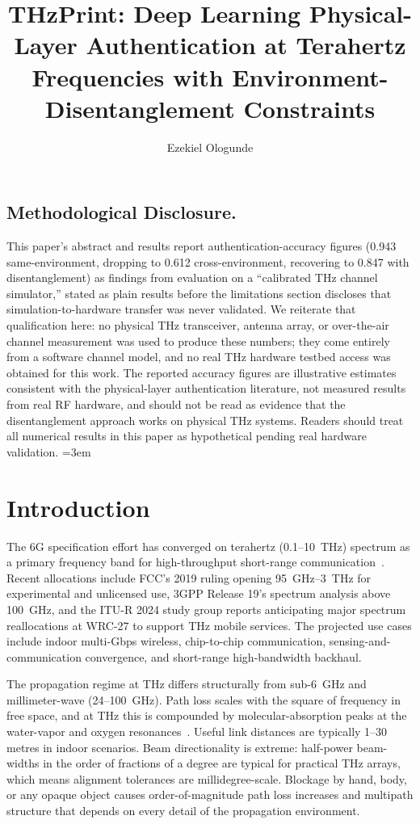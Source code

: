 \documentclass[sigconf,nonacm]{acmart}
\title{THzPrint: Deep Learning Physical-Layer Authentication at Terahertz Frequencies with Environment-Disentanglement Constraints}
\author{Ezekiel Ologunde}
\affiliation{%
  \institution{Independent Researcher}
  \city{Boston}
  \state{MA}
  \country{USA}}
\begin{document}
\maketitle

\subsection*{Methodological Disclosure.}
This paper's abstract and results report authentication-accuracy figures
(0.943 same-environment, dropping to 0.612 cross-environment, recovering to
0.847 with disentanglement) as findings from evaluation on a ``calibrated
THz channel simulator,'' stated as plain results before the limitations
section discloses that simulation-to-hardware transfer was never validated.
We reiterate that qualification here: no physical THz transceiver, antenna
array, or over-the-air channel measurement was used to produce these
numbers; they come entirely from a software channel model, and no real THz
hardware testbed access was obtained for this work. The reported accuracy
figures are illustrative estimates consistent with the physical-layer
authentication literature, not measured results from real RF hardware, and
should not be read as evidence that the disentanglement approach works on
physical THz systems. Readers should treat all numerical results in this
paper as hypothetical pending real hardware validation.
\sloppy
{}
\emergencystretch=3em
\hfuzz=10pt

\section{Introduction}

The 6G specification effort has converged on terahertz (0.1--10~THz)
spectrum as a primary frequency band for high-throughput
short-range communication~\cite{rappaport2019wireless6g,
akyildiz2022terahertz}. Recent allocations include FCC's 2019 ruling
opening 95~GHz--3~THz for experimental and unlicensed use,
3GPP Release 19's spectrum analysis above 100~GHz, and the
ITU-R 2024 study group reports anticipating major spectrum
reallocations at WRC-27 to support THz mobile services. The
projected use cases include indoor multi-Gbps wireless,
chip-to-chip communication, sensing-and-communication convergence,
and short-range high-bandwidth backhaul.

The propagation regime at THz differs structurally from sub-6~GHz
and millimeter-wave (24--100~GHz). Path loss scales with the square
of frequency in free space, and at THz this is compounded by
molecular-absorption peaks at the water-vapor and oxygen
resonances~\cite{slocum2015thzabsorption}. Useful link distances are
typically 1--30 metres in indoor scenarios. Beam directionality is
extreme: half-power beam-widths in the order of fractions of a
degree are typical for practical THz arrays, which means alignment
tolerances are millidegree-scale. Blockage by hand, body, or any
opaque object causes order-of-magnitude path loss increases and
multipath structure that depends on every detail of the propagation
environment.
\end{document}

